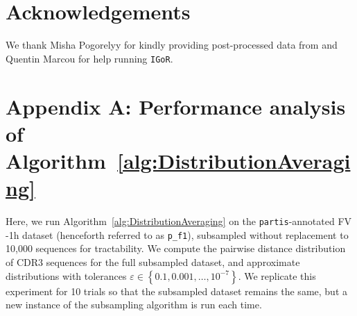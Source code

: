 \documentclass{article}
\newcommand{\partis}{\texttt{partis}}
\newcommand{\igor}{\texttt{IGoR}}
\newcommand{\beginsupplement}{%
        \setcounter{table}{0}
        \renewcommand{\thetable}{S\arabic{table}}%
        \setcounter{figure}{0}
        \renewcommand{\thefigure}{S\arabic{figure}}%
     }
\begin{document}
\section*{Acknowledgements}
We thank Misha Pogorelyy for kindly providing post-processed data from \cite{Pogorelyy2018-ak} and Quentin Marcou for help running \igor.





\beginsupplement

\section*{Appendix A: Performance analysis of Algorithm~\ref{alg:DistributionAveraging}}
Here, we run Algorithm~\ref{alg:DistributionAveraging} on the \partis-annotated FV -1h dataset (henceforth referred to as \texttt{p\_f1}), subsampled without replacement to 10,000 sequences for tractability.
We compute the pairwise distance distribution of CDR3 sequences for the full subsampled dataset, and approximate distributions with tolerances $\varepsilon \in \left\{0.1, 0.001, \dotsc, 10^{-7} \right\}$.
We replicate this experiment for 10 trials so that the subsampled dataset remains the same, but a new instance of the subsampling algorithm is run each time.
\end{document}
